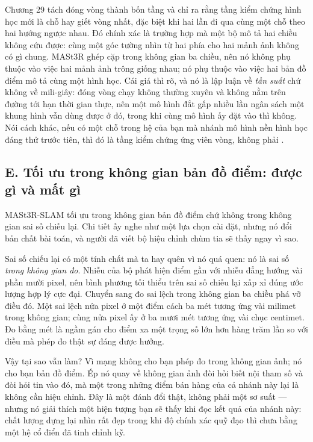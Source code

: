 \documentclass[../../deep_learning.tex]{subfiles}
\begin{document}
Chương 29 tách đóng vòng thành bốn tầng và chỉ ra rằng tầng kiểm chứng hình học mới là chỗ hay giết vòng nhất, đặc biệt khi hai lần đi qua cùng một chỗ theo hai hướng ngược nhau. Đó chính xác là trường hợp mà một bộ mô tả hai chiều không cứu được: cùng một góc tường nhìn từ hai phía cho hai mảnh ảnh không có gì chung. MASt3R ghép cặp trong không gian ba chiều, nên nó không phụ thuộc vào việc hai mảnh ảnh trông giống nhau; nó phụ thuộc vào việc hai bản đồ điểm mô tả cùng một hình học.
Cái giá thì rõ, và nó là lập luận về \emph{tần suất} chứ không về mili-giây: đóng vòng chạy không thường xuyên và không nằm trên đường tới hạn thời gian thực, nên một mô hình đắt gấp nhiều lần ngân sách một khung hình vẫn dùng được ở đó, trong khi cùng mô hình ấy đặt vào  thì không. Nói cách khác, nếu có một chỗ trong hệ của bạn mà nhánh mô hình nền hình học đáng thử trước tiên, thì đó là tầng kiểm chứng ứng viên vòng, không phải .

\subsection{E. Tối ưu trong không gian bản đồ điểm: được gì và mất gì}
MASt3R-SLAM tối ưu trong không gian bản đồ điểm chứ không trong không gian sai số chiếu lại. Chi tiết ấy nghe như một lựa chọn cài đặt, nhưng nó đổi bản chất bài toán, và người đã viết bộ hiệu chỉnh chùm tia sẽ thấy ngay vì sao.

Sai số chiếu lại có một tính chất mà ta hay quên vì nó quá quen: nó là sai số \emph{trong không gian đo}. Nhiễu của bộ phát hiện điểm gần với nhiễu đẳng hướng vài phần mười pixel, nên bình phương tối thiểu trên sai số chiếu lại xấp xỉ đúng ước lượng hợp lý cực đại. Chuyển sang đo sai lệch trong không gian ba chiều phá vỡ điều đó. Một sai lệch nửa pixel ở một điểm cách ba mét tương ứng vài milimet trong không gian; cùng nửa pixel ấy ở ba mươi mét tương ứng vài chục centimet. Đo bằng mét là ngầm gán cho điểm xa một trọng số lớn hơn hàng trăm lần so với điều mà phép đo thật sự đáng được hưởng.

Vậy tại sao vẫn làm? Vì mạng không cho bạn phép đo trong không gian ảnh; nó cho bạn bản đồ điểm. Ép nó quay về không gian ảnh đòi hỏi biết nội tham số và đòi hỏi tin vào đó, mà một trong những điểm bán hàng của cả nhánh này lại là không cần hiệu chỉnh. Đây là một đánh đổi thật, không phải một sơ suất --- nhưng nó giải thích một hiện tượng bạn sẽ thấy khi đọc kết quả của nhánh này: chất lượng dựng lại nhìn rất đẹp trong khi độ chính xác quỹ đạo thì chưa bằng một hệ cổ điển đã tinh chỉnh kỹ.
\end{document}
